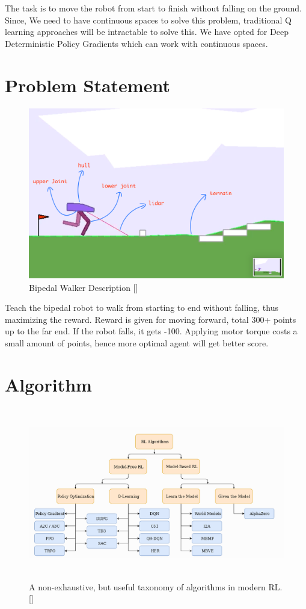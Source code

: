\documentclass[a4paper]{article}
\begin{document}
The task is to move the robot from start to finish without falling on the ground. Since, We need to have continuous spaces to solve this problem, traditional Q learning approaches will be intractable to solve this. We have opted for Deep Deterministic Policy Gradients which can work with continuous spaces. 

\clearpage
\section*{Problem Statement}

\begin{figure}
\centering
\includegraphics[width=150mm,height=75mm]{Pictures/bipedal.png}
\caption{Bipedal Walker Description [\cite{bipedalPic:2019}]}
\label{bipedal}
\end{figure}

Teach the bipedal robot to walk from starting to end without falling, thus maximizing the reward. Reward is given for moving forward, total 300+ points up to the far end. If the robot falls, it gets -100. Applying motor torque costs a small amount of points, hence more optimal agent will get better score. 

\section*{Algorithm}

\begin{figure}
\centering
\includegraphics[width=150mm,height=75mm]{Pictures/RLAlgoChart.png}
\caption{A non-exhaustive, but useful taxonomy of algorithms in modern RL. [\cite{rlIntro2:2019}]}
\label{chart}
\end{figure}
\end{document}
